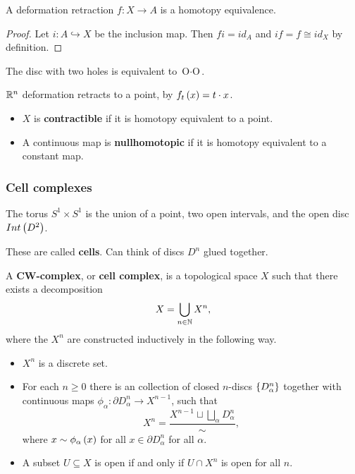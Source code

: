 \begin{lemma}
A deformation retraction $ f : X \to A $ is a homotopy equivalence.
\end{lemma}

\begin{proof}
Let $ i : A \hookrightarrow X $ be the inclusion map. Then $ fi = id_A $ and $ if = f \cong id_X $ by definition.
\end{proof}

\begin{example*}
The disc with two holes is equivalent to $ \text{O} \cdot \text{O} $.
\end{example*}

\begin{example*}
$ \mathbb{R}^n $ deformation retracts to a point, by $ f_t\left( x \right) = t \cdot x $.
\end{example*}

\begin{definition*}
\hfill
\begin{itemize}
\item $ X $ is \textbf{contractible} if it is homotopy equivalent to a point.
\item A continuous map is \textbf{nullhomotopic} if it is homotopy equivalent to a constant map.
\end{itemize}
\end{definition*}

\pagebreak

\subsubsection{Cell complexes}

\begin{example*}
The torus $ S^1 \times S^1 $ is the union of a point, two open intervals, and the open disc $ Int\left( D^2 \right) $.
\end{example*}

These are called \textbf{cells}. Can think of discs $ D^n $ glued together.


\begin{definition*}
A \textbf{CW-complex}, or \textbf{cell complex}, is a topological space $ X $ such that there exists a decomposition
$$ X = \bigcup_{n \in \mathbb{N}} X^n, $$
where the $ X^n $ are constructed inductively in the following way.
\begin{itemize}
\item $ X^n $ is a discrete set.
\item For each $ n \ge 0 $ there is an collection of closed $ n $-discs $ \left\{ D_\alpha^n \right\} $ together with continuous maps $ \phi_\alpha : \partial D_\alpha^n \to X^{n - 1} $, such that
$$ X^n = \dfrac{X^{n - 1} \sqcup \bigsqcup_\alpha D_\alpha^n}{\sim}, $$
where $ x \sim \phi_\alpha\left( x \right) $ for all $ x \in \partial D_\alpha^n $ for all $ \alpha $.
\item A subset $ U \subseteq X $ is open if and only if $ U \cap X^n $ is open for all $ n $.
\end{itemize}
\end{definition*}

